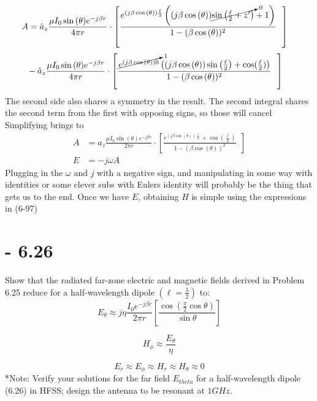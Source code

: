 \documentclass[12pt]{article}
\begin{document}
\begin{align*}
  A &=\hat{a}_z\frac{\mu I_0\sin{(\theta)}e^{-j\beta r}}{4\pi r}\cdot \left[\frac {e^{(j\beta \cos{(\theta)})\frac{\ell}{2}}  \left((j\beta \cos{(\theta)})
      \cancelto{0}{\sin{\left(\frac{\ell}{2}+z'\right)}  } + 1\right)
      }{1-(\beta\cos{(\theta)})^{2}}\ \ \right]
\end{align*} 
\begin{align*}
   &-\hat{a}_z\frac{\mu I_0\sin{(\theta)}e^{-j\beta r}}{4\pi r}\cdot \left[\frac {\cancelto{1}{e^{(j\beta \cos{(\theta)})0}}  \left((j\beta \cos{(\theta)})
      \sin{\left(\frac{\ell}{2}\right)}  + \cos(\frac{\ell}{2})\right)
      }{1-(\beta\cos{(\theta)})^{2}}\ \ \right]
\end{align*}
The second side also shares a symmetry in the result. The second integral shares the second term from the first with opposing signs, so those will cancel Simplifying brings to
\begin{align*}
  A &= \hat{a}_z\frac{\mu I_0\sin{(\theta)}e^{-j\beta r}}{2\pi r}\cdot \left[\frac {e^{(j\beta \cos{(\theta)})\frac{\ell}{2}} + \cos\left(\frac{\ell}{2}\right)
      }{1-(\beta\cos{(\theta)})^{2}}\ \ \right]\\
  E &= -j\omega A
\end{align*}
Plugging in the $\omega$ and $j$ with a negative sign, and manipulating in some way with identities or some clever subs with Eulers identity will probably be the thing that gets us to the end. Once we have $E$, obtaining $H$ is simple using the expressions in (6-97)   
\section{- 6.26}
 Show that the radiated far-zone electric and magnetic fields derived in Problem 6.25 reduce for a half-wavelength dipole $(\ell = \frac{\lambda}{2})$ to:
\[
E_{\theta} \approx j \eta \frac{I_0 e^{-j \beta r}}{2\pi r} 
\left[\frac{\cos\left(\frac{\pi}{2} \cos \theta\right)}{
\sin \theta}\right]
\]

\[
H_{\phi} \approx \frac{E_{\theta}}{\eta}
\]

\[
E_r \approx E_{\phi} \approx H_r \approx H_{\theta} \approx 0
\]
*Note: Verify your solutions for the far field $E_{theta}$ for a half-wavelength dipole (6.26) in HFSS; design the antenna to be resonant at $1GHz$.\\
\end{document}

